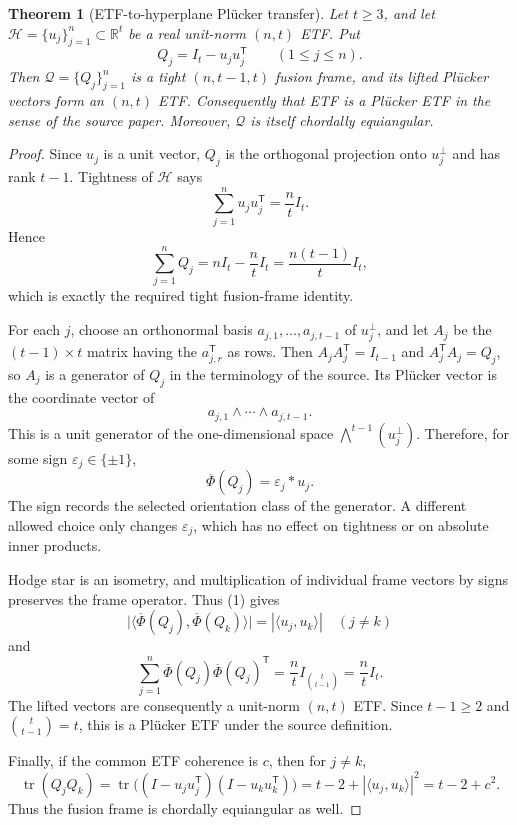 \documentclass[11pt]{article}
\newtheorem{theorem}{Theorem}
\newcommand{\R}{\mathbb R}
\newcommand{\cH}{\mathcal H}
\newcommand{\cQ}{\mathcal Q}
\newcommand{\ip}[2]{\langle #1,#2\rangle}
\newcommand{\tr}{\operatorname{tr}}
\begin{document}
\begin{theorem}[ETF-to-hyperplane Pl\"ucker transfer]\label{thm:transfer}
Let $t\geq3$, and let $\cH=\{u_j\}_{j=1}^n\subset\R^t$ be a real
unit-norm $(n,t)$ ETF.  Put
\[
 Q_j=I_t-u_ju_j^{\mathsf T}\qquad(1\leq j\leq n).
\]
Then $\cQ=\{Q_j\}_{j=1}^n$ is a tight $(n,t-1,t)$ fusion frame, and its
lifted Pl\"ucker vectors form an $(n,t)$ ETF.  Consequently that ETF is a
Pl\"ucker ETF in the sense of the source paper.  Moreover, $\cQ$ is itself
chordally equiangular.
\end{theorem}

\begin{proof}
Since $u_j$ is a unit vector, $Q_j$ is the orthogonal projection onto
$u_j^\perp$ and has rank $t-1$.  Tightness of $\cH$ says
\[
 \sum_{j=1}^n u_ju_j^{\mathsf T}=\frac nt I_t.
\]
Hence
\[
 \sum_{j=1}^n Q_j
 =nI_t-\frac nt I_t
 =\frac{n(t-1)}t I_t,
\]
which is exactly the required tight fusion-frame identity.

For each $j$, choose an orthonormal basis
$a_{j,1},\ldots,a_{j,t-1}$ of $u_j^\perp$, and let $A_j$ be the
$(t-1)\times t$ matrix having the $a_{j,r}^{\mathsf T}$ as rows.  Then
$A_jA_j^{\mathsf T}=I_{t-1}$ and $A_j^{\mathsf T}A_j=Q_j$, so $A_j$ is a
generator of $Q_j$ in the terminology of the source.  Its Pl\"ucker vector
is the coordinate vector of
\[
 a_{j,1}\wedge\cdots\wedge a_{j,t-1}.
\]
This is a unit generator of the one-dimensional space
$\bigwedge^{t-1}(u_j^\perp)$.  Therefore, for some sign
$\varepsilon_j\in\{\pm1\}$,
\[
 \overline\Phi(Q_j)=\varepsilon_j *u_j.                 \tag{1}
\]
The sign records the selected orientation class of the generator.  A
different allowed choice only changes $\varepsilon_j$, which has no effect
on tightness or on absolute inner products.

Hodge star is an isometry, and multiplication of individual frame vectors
by signs preserves the frame operator.  Thus (1) gives
\[
 \bigl|\ip{\overline\Phi(Q_j)}{\overline\Phi(Q_k)}\bigr|
 =|\ip{u_j}{u_k}|
 \quad(j\ne k)
\]
and
\[
 \sum_{j=1}^n \overline\Phi(Q_j)\overline\Phi(Q_j)^{\mathsf T}
 =\frac nt I_{\binom{t}{t-1}}
 =\frac nt I_t.
\]
The lifted vectors are consequently a unit-norm $(n,t)$ ETF.  Since
$t-1\geq2$ and $\binom{t}{t-1}=t$, this is a Pl\"ucker ETF under the
source definition.

Finally, if the common ETF coherence is $c$, then for $j\ne k$,
\[
 \tr(Q_jQ_k)
 =\tr\bigl((I-u_ju_j^{\mathsf T})(I-u_ku_k^{\mathsf T})\bigr)
 =t-2+|\ip{u_j}{u_k}|^2=t-2+c^2.
\]
Thus the fusion frame is chordally equiangular as well.
\end{proof}
\end{document}

